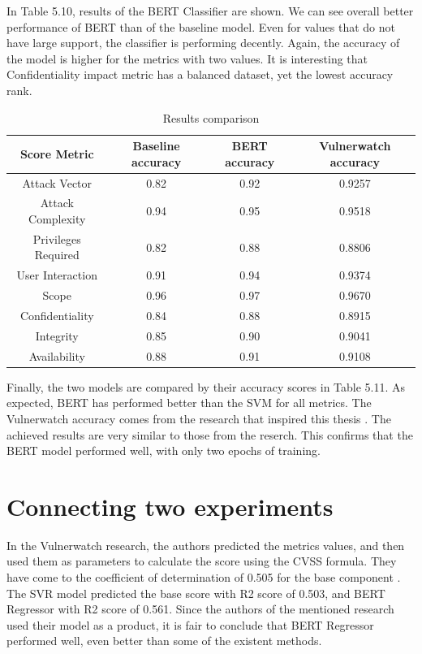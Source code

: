 \documentclass[times, utf8, zavrsni, english]{fer}
\begin{document}
\noindent In Table 5.10, results of the BERT Classifier are shown.
We can see overall better performance of BERT than of the baseline model.
Even for values that do not have large support, the classifier is performing decently. 
Again, the accuracy of the model is higher for the metrics with two values.
It is interesting that Confidentiality impact metric has a balanced dataset, yet the lowest accuracy rank.

\begin{table}[h!]
	\centering
	\begin{tabular}{| c | c | c | c|} 
		\hline
		Score Metric & Baseline accuracy & BERT accuracy & Vulnerwatch accuracy \\ [0.5ex] 
		\hline\hline
		Attack Vector & 0.82 & 0.92 & 0.9257\\
		\hline
		Attack Complexity & 0.94 & 0.95 & 0.9518 \\
		\hline
		Privileges Required & 0.82 & 0.88 & 0.8806 \\
		\hline
		User Interaction & 0.91 & 0.94 & 0.9374\\
		\hline
		Scope & 0.96 & 0.97 & 0.9670 \\
		\hline
		Confidentiality & 0.84 & 0.88 & 0.8915\\
		\hline
		Integrity & 0.85 & 0.90 & 0.9041\\
		\hline
		Availability & 0.88 & 0.91 & 0.9108 \\
		\hline
		
	\end{tabular}
	\caption{Results comparison}
	\label{table:14}
\end{table}

\noindent Finally, the two models are compared by their accuracy scores in Table 5.11.
As expected, BERT has performed better than the SVM for all metrics.
The Vulnerwatch accuracy comes from the research that inspired this thesis \citep{vulnerwatch}. The achieved results are very similar to those from the reserch. This confirms that the BERT model performed well, with only two epochs of training.

\section{Connecting two experiments}
In the Vulnerwatch research, the authors predicted the metrics values, and then used them as parameters to calculate the score using the CVSS formula. They have come to the coefficient of determination of 0.505 for the base component \citep{vulnerwatch}.
The SVR model predicted the base score with R2 score of 0.503, and BERT Regressor with R2 score of 0.561.
Since the authors of the mentioned research used their model as a product, it is fair to conclude that BERT Regressor performed well, even better than some of the existent methods.
\end{document}
